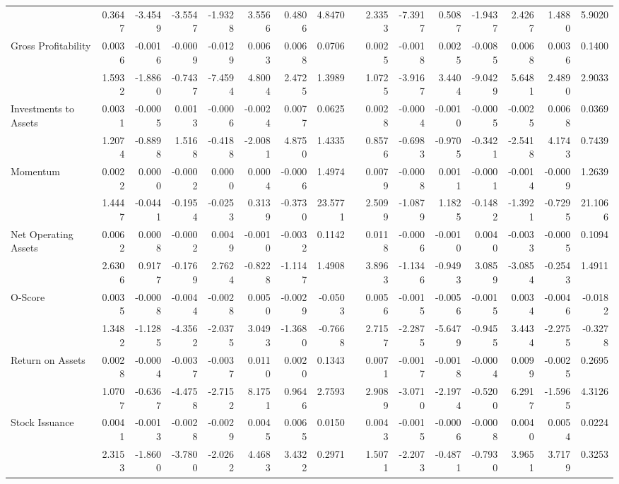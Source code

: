\begin{sidewaystable}[htbp]
{\begin{tabular}{lrrrrrrrrrrrrrrr}
& 0.3647 & -3.4549 & -3.5547 & -1.9328 & 3.5566 & 0.4806 & 4.8470 &       & 2.3353 & -7.3917 & 0.5087 & -1.9437 & 2.4267 & 1.4880 & 5.9020 \\
Gross Profitability & 0.0036 & -0.0016 & -0.0009 & -0.0129 & 0.0063 & 0.0068 & 0.0706 &       & 0.0025 & -0.0018 & 0.0025 & -0.0085 & 0.0068 & 0.0036 & 0.1400 \\
& 1.5932 & -1.8860 & -0.7437 & -7.4594 & 4.8004 & 2.4725 & 1.3989 &       & 1.0725 & -3.9167 & 3.4404 & -9.0429 & 5.6481 & 2.4890 & 2.9033 \\
Investments to Assets & 0.0031 & -0.0005 & 0.0013 & -0.0006 & -0.0024 & 0.0077 & 0.0625 &       & 0.0028 & -0.0004 & -0.0010 & -0.0005 & -0.0025 & 0.0068 & 0.0369 \\
& 1.2074 & -0.8898 & 1.5168 & -0.4188 & -2.0081 & 4.8750 & 1.4335 &       & 0.8576 & -0.6983 & -0.9705 & -0.3421 & -2.5418 & 4.1743 & 0.7439 \\
Momentum & 0.0022 & 0.0000 & -0.0002 & 0.0000 & 0.0004 & -0.0006 & 1.4974 &       & 0.0079 & -0.0008 & 0.0011 & -0.0001 & -0.0014 & -0.0009 & 1.2639 \\
& 1.4447 & -0.0441 & -0.1954 & -0.0253 & 0.3139 & -0.3730 & 23.5771 &       & 2.5099 & -1.0879 & 1.1825 & -0.1482 & -1.3921 & -0.7295 & 21.1066 \\
Net Operating Assets & 0.0062 & 0.0008 & -0.0002 & 0.0049 & -0.0010 & -0.0032 & 0.1142 &       & 0.0118 & -0.0006 & -0.0010 & 0.0040 & -0.0033 & -0.0005 & 0.1094 \\
& 2.6306 & 0.9177 & -0.1769 & 2.7624 & -0.8228 & -1.1147 & 1.4908 &       & 3.8963 & -1.1346 & -0.9493 & 3.0859 & -3.0854 & -0.2543 & 1.4911 \\
O-Score & 0.0035 & -0.0008 & -0.0044 & -0.0028 & 0.0050 & -0.0029 & -0.0503 &       & 0.0056 & -0.0015 & -0.0056 & -0.0015 & 0.0034 & -0.0046 & -0.0182 \\
& 1.3482 & -1.1285 & -4.3562 & -2.0375 & 3.0493 & -1.3680 & -0.7668 &       & 2.7157 & -2.2875 & -5.6479 & -0.9455 & 3.4434 & -2.2755 & -0.3278 \\
Return on Assets & 0.0028 & -0.0004 & -0.0037 & -0.0037 & 0.0110 & 0.0020 & 0.1343 &       & 0.0071 & -0.0017 & -0.0018 & -0.0004 & 0.0099 & -0.0025 & 0.2695 \\
& 1.0707 & -0.6367 & -4.4758 & -2.7152 & 8.1751 & 0.9646 & 2.7593 &       & 2.9089 & -3.0710 & -2.1974 & -0.5200 & 6.2917 & -1.5965 & 4.3126 \\
Stock Issuance & 0.0041 & -0.0013 & -0.0028 & -0.0029 & 0.0045 & 0.0065 & 0.0150 &       & 0.0043 & -0.0015 & -0.0006 & -0.0008 & 0.0040 & 0.0054 & 0.0224 \\
& 2.3153 & -1.8600 & -3.7800 & -2.0262 & 4.4683 & 3.4322 & 0.2971 &       & 1.5071 & -2.2073 & -0.4871 & -0.7930 & 3.9651 & 3.7179 & 0.3253 \\
\bottomrule
\end{tabular}%
}
\label{tab:liq-ff6}%
\end{sidewaystable}%

